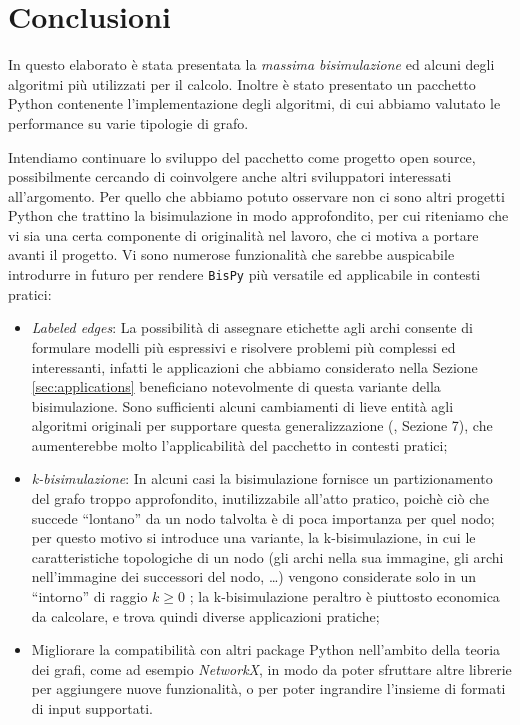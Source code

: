 \section{Conclusioni}
\label{sec:conclusions}
In questo elaborato è stata presentata la \emph{massima bisimulazione} ed alcuni degli algoritmi più utilizzati per il calcolo. Inoltre è stato presentato un pacchetto Python contenente l'implementazione degli algoritmi, di cui abbiamo valutato le performance su varie tipologie di grafo.

Intendiamo continuare lo sviluppo del pacchetto come progetto open source, possibilmente cercando di coinvolgere anche altri sviluppatori interessati all'argomento. Per quello che abbiamo potuto osservare non ci sono altri progetti Python che trattino la bisimulazione in modo approfondito, per cui riteniamo che vi sia una certa componente di originalità nel lavoro, che ci motiva a portare avanti il progetto. Vi sono numerose funzionalità che sarebbe auspicabile introdurre in futuro per rendere \texttt{BisPy} più versatile ed applicabile in contesti pratici:
\begin{itemize}
    \item \emph{Labeled edges}: La possibilità di assegnare etichette agli archi consente di formulare modelli più espressivi e risolvere problemi più complessi ed interessanti, infatti le applicazioni che abbiamo considerato nella Sezione \ref{sec:applications} beneficiano notevolmente di questa variante della bisimulazione. Sono sufficienti alcuni cambiamenti di lieve entità agli algoritmi originali per supportare questa generalizzazione (\cite{dovier}, Sezione 7), che aumenterebbe molto l'applicabilità del pacchetto in contesti pratici;
    \item \emph{k-bisimulazione}: In alcuni casi la bisimulazione fornisce un partizionamento del grafo troppo approfondito, inutilizzabile all'atto pratico, poichè ciò che succede ``lontano'' da un nodo talvolta è di poca importanza per quel nodo; per questo motivo si introduce una variante, la k-bisimulazione, in cui le caratteristiche topologiche di un nodo (gli archi nella sua immagine, gli archi nell'immagine dei successori del nodo, \dots) vengono considerate solo in un ``intorno'' di raggio $k \geq 0$ \cite{kbisi}; la k-bisimulazione peraltro è piuttosto economica da calcolare, e trova quindi diverse applicazioni pratiche;
    \item Migliorare la compatibilità con altri package Python nell'ambito della teoria dei grafi, come ad esempio \emph{NetworkX}, in modo da poter sfruttare altre librerie per aggiungere nuove funzionalità, o per poter ingrandire l'insieme di formati di input supportati.
\end{itemize}
